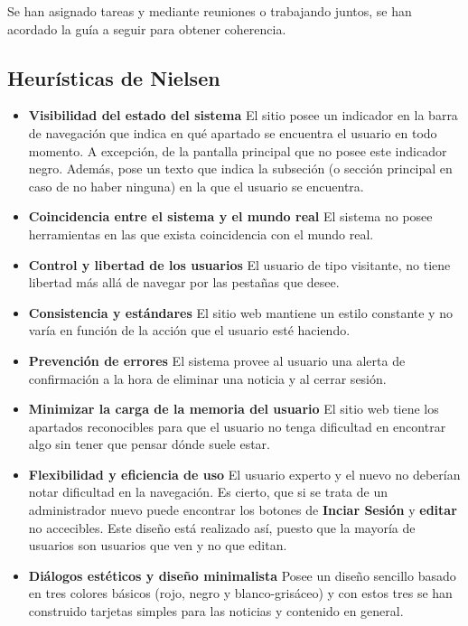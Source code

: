 \documentclass[10pt, spanish, pdftex]{template/UC3M_document}
\begin{document}
Se han asignado tareas y mediante reuniones o trabajando juntos, se han acordado la guía a seguir para obtener coherencia.


\subsection{Heurísticas de Nielsen}
  \begin{itemize}
    \item \textbf{Visibilidad del estado del sistema}
    El sitio posee un indicador en la barra de navegación que indica en qué apartado se encuentra el usuario en todo momento. A excepción, de la pantalla principal que no posee este indicador negro.
    Además, pose un texto que indica la subseción (o sección principal en caso de no haber ninguna) en la que el usuario se encuentra.

    \item \textbf{Coincidencia entre el sistema y el mundo real}
    El sistema no posee herramientas en las que exista coincidencia con el mundo real.

    \item \textbf{Control y libertad de los usuarios}
    El usuario de tipo visitante, no tiene libertad más allá de navegar por las pestañas que desee.

    \item \textbf{Consistencia y estándares}
    El sitio web mantiene un estilo constante y no varía en función de la acción que el usuario esté haciendo.

    \item \textbf{Prevención de errores}
    El sistema provee al usuario una alerta de confirmación a la hora de eliminar una noticia y al cerrar sesión.

    \item \textbf{Minimizar la carga de la memoria del usuario}
    El sitio web tiene los apartados reconocibles para que el usuario no tenga dificultad en encontrar algo sin tener que pensar dónde suele estar.

    \item \textbf{Flexibilidad y eficiencia de uso}
    El usuario experto y el nuevo no deberían notar dificultad en la navegación. Es cierto, que si se trata de un administrador nuevo puede encontrar los botones de \textbf{Inciar Sesión} y \textbf{editar} no accecibles. Este diseño está realizado así, puesto que la mayoría de usuarios son usuarios que ven y no que editan.

    \item \textbf{Diálogos estéticos y diseño minimalista}
    Posee un diseño sencillo basado en tres colores básicos (rojo, negro y blanco-grisáceo) y con estos tres se han construido tarjetas simples para las noticias y contenido en general.


\end{itemize}
\end{document}
